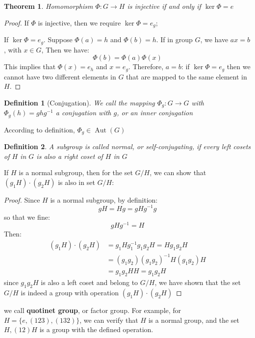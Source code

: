 \documentclass{amsart}
\newtheorem{definition}{Definition}
\newtheorem{theorem}{Theorem}
\DeclareMathOperator{\Aut}{Aut}
\begin{document}
\begin{theorem}
    Homomorphism $\Phi\colon G\to H$ is injective if and only if $\ker \Phi = e$
\end{theorem}
\begin{proof}
    If $\Phi$ is injective, then we require $\ker \Phi = e_g$; 

    If $\ker \Phi = e_g$. Suppose $\Phi(a) = h$ and $\Phi(b) = h$. If in group $G$, we have $ax = b$, with $x\in G$, 
    Then we have:
    \[  
        \Phi(b) = \Phi(a)\Phi(x)    
    \]
    This implies that $\Phi(x)=e_h$ and $x = e_g$. Therefore, $a = b$: if $\ker \Phi = e_g$ then we cannot have
    two different elements in $G$ that are mapped to the same element in $H$.
\end{proof}

\vspace{10pt}

\begin{definition}
    [Conjugation]
    We call the mapping $\Phi_g\colon G\to G$ with $\Phi_g(h) = ghg^{-1}$ a conjugation with $g$, or an \emph{inner conjugation}
\end{definition}
According to definition, $\Phi_g \in \Aut(G)$

\begin{definition}
    A subgroup is called normal, or self-conjugating, if every left cosets of $H$ in $G$ is also a right coset of $H$ in $G$
\end{definition}
If $H$ is a normal subgroup, then for the set $G/H$, we can show that $(g_1 H)\cdot(g_2 H)$ is also in 
set $G/H$:
\begin{proof}
    Since $H$ is a normal subgroup, by definition: 
    \[gH = Hg = gHg^{-1}g\] so that we fine:
    \[gHg^{-1} = H\]
    Then:
    \begin{align*}
        (g_1 H)\cdot(g_2 H) &= g_1 H g_1^{-1}g_1 g_2 H = H g_1 g_2 H \\
            &= (g_1g_2)(g_1g_2)^{-1} H (g_1g_2) H \\
            &= g_1g_2 H H = g_1 g_2 H 
    \end{align*}
    since $g_1 g_2 H$ is also a left coset and belong to $G/H$, we have shown that the set $G/H$ is indeed a group with 
    operation $(g_1 H)\cdot(g_2 H)$
\end{proof}

we call \textbf{quotinet group}, or factor group.
For example, for $H = \{e,(123),(132)\}$, we can verify that $H$ is a normal group, and the 
set ${H, (12)H}$ is a group with the defined operation.
\end{document}
